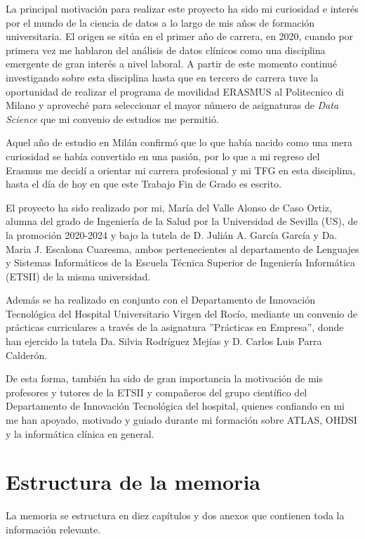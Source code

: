 La principal motivación para realizar este proyecto ha sido mi curiosidad e interés por el mundo de la ciencia de datos a lo largo de mis años de formación universitaria. El origen se sitúa en el primer año de carrera, en 2020, cuando por primera vez me hablaron del análisis de datos clínicos como una disciplina emergente de gran interés a nivel laboral. A partir de este momento continué investigando sobre esta disciplina hasta que en tercero de carrera tuve la oportunidad de realizar el programa de movilidad ERASMUS al Politecnico di Milano y aproveché para seleccionar el mayor número de asignaturas de \textit{Data Science} que mi convenio de estudios me permitió. 

Aquel año de estudio en Milán confirmó que lo que había nacido como una mera curiosidad se había convertido en una pasión, por lo que a mi regreso del Erasmus me decidí a orientar mi carrera profesional y mi TFG en esta disciplina, hasta el día de hoy en que este Trabajo Fin de Grado es escrito.

El proyecto ha sido realizado por mi, María del Valle Alonso de Caso Ortiz, alumna del grado de Ingeniería de la Salud por la Universidad de Sevilla (US), de la promoción 2020-2024 y bajo la tutela de D. Julián A. García García y Da. Maria J. Escalona Cuaresma, ambos pertenecientes al departamento de Lenguajes y Sistemas Informáticos de la Escuela Técnica Superior de Ingeniería Informática (ETSII) de la misma universidad. 

Además se ha realizado en conjunto con el Departamento de Innovación Tecnológica del Hospital Universitario Virgen del Rocío, mediante un convenio de prácticas curriculares a través de la asignatura ''Prácticas en Empresa'', donde han ejercido la tutela Da. Silvia Rodríguez Mejías y D. Carlos Luis Parra Calderón. 

De esta forma, también ha sido de gran importancia la motivación de mis profesores y tutores de la ETSII y compañeros del grupo científico del Departamento de Innovación Tecnológica del hospital, quienes confiando en mi me han apoyado, motivado y guiado durante mi formación sobre ATLAS, OHDSI y la informática clínica en general.

\section{Estructura de la memoria} \label{sec:01estructura}

La memoria se estructura en diez capítulos y dos anexos que contienen toda la información relevante.

